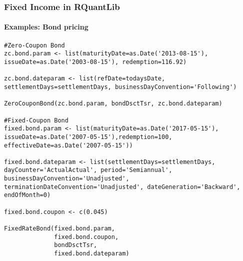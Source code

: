 \documentclass[smaller,compress]{beamer}
\begin{document}
\begin{frame}[fragile]
	\frametitle{Fixed Income in RQuantLib}
	\framesubtitle{Examples: Bond pricing}	
			\lstset{language=R,basicstyle=\tiny}
				\begin{lstlisting}
#Zero-Coupon Bond
zc.bond.param <- list(maturityDate=as.Date('2013-08-15'), issueDate=as.Date('2003-08-15'), redemption=116.92)

zc.bond.dateparam <- list(refDate=todaysDate, settlementDays=settlementDays, businessDayConvention='Following')

ZeroCouponBond(zc.bond.param, bondDsctTsr, zc.bond.dateparam)

#Fixed-Coupon Bond
fixed.bond.param <- list(maturityDate=as.Date('2017-05-15'), issueDate=as.Date('2007-05-15'),redemption=100, effectiveDate=as.Date('2007-05-15'))

fixed.bond.dateparam <- list(settlementDays=settlementDays, dayCounter='ActualActual', period='Semiannual', businessDayConvention='Unadjusted', terminationDateConvention='Unadjusted', dateGeneration='Backward', endOfMonth=0)

fixed.bond.coupon <- c(0.045)

FixedRateBond(fixed.bond.param,
              fixed.bond.coupon,
              bondDsctTsr,
              fixed.bond.dateparam)
\end{lstlisting}
\end{frame}
\end{document}
